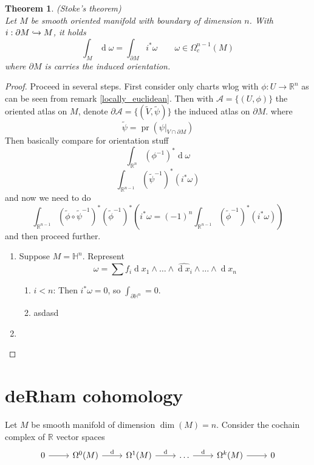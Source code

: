 \documentclass{article}
\newtheorem{theorem}{Theorem}
\numberwithin{theorem}{section}
\renewcommand{\d}[1]{\ensuremath{\operatorname{d}\!{#1}}}
\newcommand{\R}{\mathbb{R}}
\newcommand{\1}{\mathds{1}}
\newcommand{\Hp}{\mathbb{H}}
\DeclareMathOperator{\pr}{pr}
\begin{document}
\begin{theorem}(Stoke's theorem)\\
    Let $M$ be smooth oriented manifold with boundary of dimension $n$. With $i: \partial M \xhookrightarrow{} M $, it holds 
    \[ \int_M \d \omega = \int_{\partial M}i^* \omega \qquad \omega \in \Omega^{n-1}_c(M) \]
    where $\partial M$ is carries the induced orientation. 
\end{theorem}

\begin{proof}
    Proceed in several steps. 
    First consider only charts wlog with $\phi: U \to \R^n$ as can be seen from remark \ref{locally_euclidean}. Then with $\mathcal{A} = \{ (U, \phi)\}$ the oriented atlas on $M$, denote $\partial \mathcal{A} = \{ (\tilde{V}, \tilde{\psi}) \} $ the induced atlas on $\partial M$. where 
    \[ \tilde{\psi} = \pr(\psi|_{V \cap \partial M }) \]
    Then basically compare for orientation stuff 
    \[ \int_{\R^n} (\phi^{-1})^* \d{\omega} \]
    \[ \int_{\R^{n-1}} (\tilde{\psi}^{-1})^*(i^*\omega)\]
    and now we need to do 
    \[  \int_{\R^{n-1}} (\tilde{\phi} \circ \tilde{\psi}^{-1})^*(\tilde{\phi}^{-1})^*(i^*\omega = (-1)^n \int_{\R^{n-1}} (\tilde{\phi}^{-1})^*(i^*\omega))\]
    and then proceed further. 
    \begin{enumerate}
        \item Suppose $M= \Hp^n$. Represent 
        \[ \omega = \sum f_i \d{x_1} \wedge \dots \wedge \widehat{\d{x_i}} \wedge \dots \wedge \d{x_n} \]
        \begin{enumerate}
            \item $i<n$: Then $i^* \omega = 0$, so $\int_{\partial \Hp^n } = 0 $.  
            \item asdasd 
        \end{enumerate}
        
        \item 
    \end{enumerate}
\end{proof}

\section{deRham cohomology}
Let $M$ be smooth manifold of dimension $\dim(M) = n$. Consider the cochain complex of $\R$ vector spaces 
\[ \begin{tikzcd}
    0 \arrow{r} & \Omega^0(M) \arrow{r}{\d{}} & \Omega^1(M) \arrow{r}{\d{}} & \dots \arrow{r}{\d{}} & \Omega^k(M)  \arrow{r} & 0 
\end{tikzcd}\]
\end{document}
